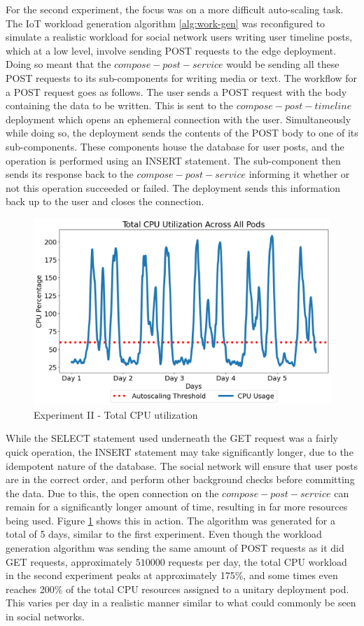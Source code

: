 For the second experiment, the focus was on a more difficult auto-scaling task. The IoT workload generation algorithm \ref{alg:work-gen} was reconfigured to simulate a realistic workload for social network users writing user timeline posts, which at a low level, involve sending POST requests to the edge deployment.
Doing so meant that the $compose-post-service$ would be sending all these POST requests to its sub-components for writing media or text. The workflow for a POST request goes as follows. The user sends a POST request with the body containing the data to be written. This is sent to the $compose-post-timeline$ deployment which opens an ephemeral connection with the user. Simultaneously while doing so, the deployment sends the contents of the POST body to one of its sub-components. These components house the database for user posts, and the operation is performed using an INSERT statement. The sub-component then sends its response back to the $compose-post-service$ informing it whether or not this operation succeeded or failed. The deployment sends this information back up to the user and closes the connection.\par

\begin{figure}[htb]
    \centering
    \caption{Experiment II - Total CPU utilization}
    \label{fig:exp2-workload}
    \includegraphics[width=0.6\linewidth]{Figures/POST-Total-CPU.png}
\end{figure}

While the SELECT statement used underneath the GET request was a fairly quick operation, the INSERT statement may take significantly longer, due to the idempotent nature of the database. The social network will ensure that user posts are in the correct order, and perform other background checks before committing the data. Due to this, the open connection on the $compose-post-service$ can remain for a significantly longer amount of time, resulting in far more resources being used. Figure \ref{fig:exp2-workload} shows this in action. The algorithm was generated for a total of 5 days, similar to the first experiment. Even though the workload generation algorithm was sending the same amount of POST requests as it did GET requests, approximately $510000$ requests per day, the total CPU workload in the second experiment peaks at approximately 175\%, and some times even reaches 200\% of the total CPU resources assigned to a unitary deployment pod. This varies per day in a realistic manner similar to what could commonly be seen in social networks.\par

